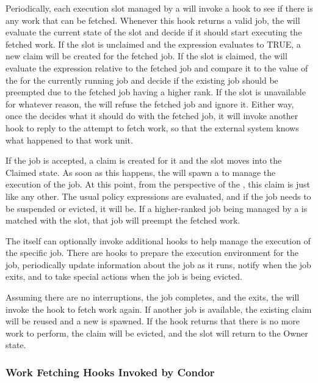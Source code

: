 Periodically, each execution slot managed by a  will
invoke a hook to see if there is any work that can be fetched.
Whenever this hook returns a valid job, the  will
evaluate the current state of the slot and decide if it should start
executing the fetched work.
If the slot is unclaimed and the  expression evaluates to
TRUE, a new claim will be created for the fetched job.
If the slot is claimed, the  will evaluate the
 expression relative to the fetched job and compare it to
the value of the  for the currently running job and decide
if the existing job should be preempted due to the fetched job having
a higher rank.
If the slot is unavailable for whatever reason, the 
will refuse the fetched job and ignore it.
Either way, once the  decides what it should do with
the fetched job, it will invoke another hook to reply to the attempt
to fetch work, so that the external system knows what happened to that
work unit.

If the job is accepted, a claim is created for it and the slot moves
into the Claimed state.
As soon as this happens, the  will spawn a
 to manage the execution of the job.
At this point, from the perspective of the , this claim
is just like any other.
The usual policy expressions are evaluated, and if the job needs to be
suspended or evicted, it will be.
If a higher-ranked job being managed by a  is matched
with the slot, that job will preempt the fetched work.

The  itself can optionally invoke additional hooks to
help manage the execution of the specific job.
There are hooks to prepare the execution environment for the job,
periodically update information about the job as it runs, notify when
the job exits, and to take special actions when the job is being evicted.

Assuming there are no interruptions, the job completes, and the
 exits, the  will invoke the hook to
fetch work again.
If another job is available, the existing claim will be reused and a
new  is spawned.
If the hook returns that there is no more work to perform, the claim
will be evicted, and the slot will return to the Owner state.


\subsubsection{\label{sec:job-hooks-hooks}
Work Fetching Hooks Invoked by Condor}

